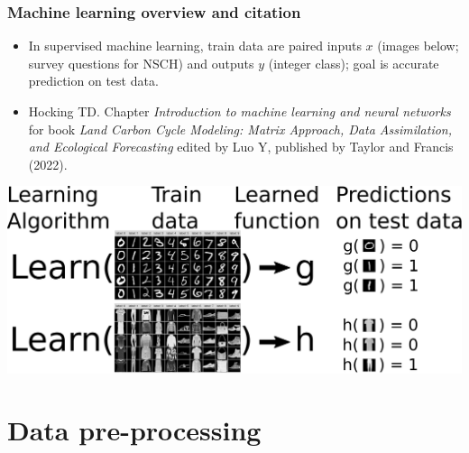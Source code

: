 \documentclass{beamer}
\begin{document}
\begin{frame}
  \frametitle{Machine learning overview and citation}
  \begin{itemize}
  \item In supervised machine learning, train data are paired inputs
    $x$ (images below; survey questions for NSCH) and outputs $y$
    (integer class); goal is accurate prediction on test data.
  \item Hocking TD. Chapter \emph{Introduction to machine learning and neural
    networks} for book \emph{Land Carbon Cycle Modeling: Matrix Approach,
    Data Assimilation, and Ecological Forecasting} edited by Luo Y,
    published by Taylor and Francis (2022).
  \end{itemize}

\includegraphics[width=\textwidth]{drawing-mnist-train-test}
\end{frame}

\section{Data pre-processing}
\end{document}

